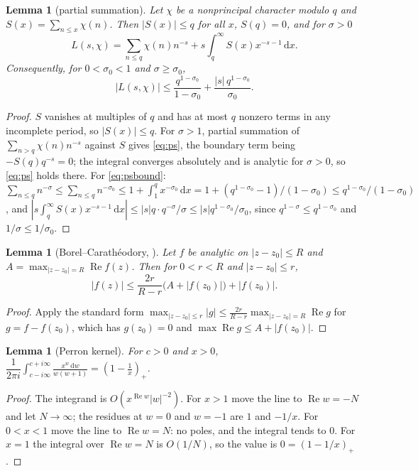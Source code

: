 \documentclass[11pt]{article}
\newtheorem{lemma}[theorem]{Lemma}
\theoremstyle{definition}
\theoremstyle{remark}
\numberwithin{equation}{section}
\newcommand{\Rea}{\operatorname{Re}}
\newcommand{\dd}{\,\mathrm{d}}
\newcommand{\pos}[1]{\left(#1\right)_+}
\begin{document}
\begin{lemma}[partial summation]\label{lem:ps}
Let $\chi$ be a nonprincipal character modulo $q$ and $S(x)=\sum_{n\le x}\chi(n)$. Then $|S(x)|\le q$ for all $x$, $S(q)=0$, and for $\sigma>0$
\begin{equation}\label{eq:ps}
 L(s,\chi)=\sum_{n\le q}\chi(n)n^{-s}+s\int_q^\infty S(x)x^{-s-1}\dd x .
\end{equation}
Consequently, for $0<\sigma_0<1$ and $\sigma\ge\sigma_0$,
\begin{equation}\label{eq:psbound}
 |L(s,\chi)|\le\frac{q^{1-\sigma_0}}{1-\sigma_0}+\frac{|s|\,q^{1-\sigma_0}}{\sigma_0}.
\end{equation}
\end{lemma}
\begin{proof}
$S$ vanishes at multiples of $q$ and has at most $q$ nonzero terms in any incomplete period, so $|S(x)|\le q$. For $\sigma>1$, partial summation of $\sum_{n>q}\chi(n)n^{-s}$ against $S$ gives \eqref{eq:ps}, the boundary term being $-S(q)q^{-s}=0$; the integral converges absolutely and is analytic for $\sigma>0$, so \eqref{eq:ps} holds there. For \eqref{eq:psbound}: $\sum_{n\le q}n^{-\sigma}\le\sum_{n\le q}n^{-\sigma_0}\le1+\int_1^qx^{-\sigma_0}\dd x=1+(q^{1-\sigma_0}-1)/(1-\sigma_0)\le q^{1-\sigma_0}/(1-\sigma_0)$, and $|s\int_q^\infty S(x)x^{-s-1}\dd x|\le|s|q\cdot q^{-\sigma}/\sigma\le|s|q^{1-\sigma_0}/\sigma_0$, since $q^{1-\sigma}\le q^{1-\sigma_0}$ and $1/\sigma\le1/\sigma_0$.
\end{proof}

\begin{lemma}[Borel--Carath\'eodory, {\cite[\S5.5]{titchmarsh1939}}]\label{lem:bc}
Let $f$ be analytic on $|z-z_0|\le R$ and $A=\max_{|z-z_0|=R}\Rea f(z)$. Then for $0<r<R$ and $|z-z_0|\le r$,
\[
 |f(z)|\le\frac{2r}{R-r}\bigl(A+|f(z_0)|\bigr)+|f(z_0)| .
\]
\end{lemma}
\begin{proof}
Apply the standard form $\max_{|z-z_0|\le r}|g|\le\frac{2r}{R-r}\max_{|z-z_0|=R}\Rea g$ for $g=f-f(z_0)$, which has $g(z_0)=0$ and $\max\Rea g\le A+|f(z_0)|$.
\end{proof}

\begin{lemma}[Perron kernel]\label{lem:kernel}
For $c>0$ and $x>0$, $\dfrac1{2\pi i}\displaystyle\int_{c-i\infty}^{c+i\infty}\frac{x^{w}\dd w}{w(w+1)}=\pos{1-\frac1x}$.
\end{lemma}
\begin{proof}
The integrand is $O(x^{\Rea w}|w|^{-2})$. For $x>1$ move the line to $\Rea w=-N$ and let $N\to\infty$; the residues at $w=0$ and $w=-1$ are $1$ and $-1/x$. For $0<x<1$ move the line to $\Rea w=N$: no poles, and the integral tends to $0$. For $x=1$ the integral over $\Rea w=N$ is $O(1/N)$, so the value is $0=\pos{1-1/x}$.
\end{proof}
\end{document}
